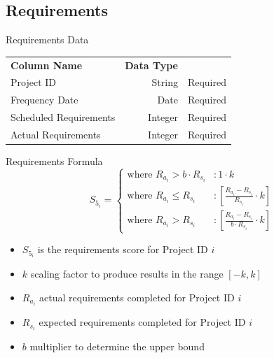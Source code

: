     \subsection{Requirements}
        \begin{frame}{Requirements Data}
            \centering
            \begin{tabular}{l | r | r}
                {\bfseries Column Name}
                 & {\bfseries Data Type}
                 &  \\
                
                Project ID & String  & Required \\
                \myrowcolour%
                Frequency Date & Date & Required \\
                Scheduled Requirements & Integer & Required \\
                \myrowcolour%
                Actual Requirements & Integer  & Required \\
            \end{tabular}
        \end{frame} 
        \begin{frame}{Requirements Formula }
        \begin{displaymath}
            S_{5_i} = \left\{
             \begin{array}{lr}
               \text{where } R_{a_i} > b \cdot R_{s_i} & :  1 \cdot k \\
               \text{where } R_{a_i} \leq R_{s_i} & : \left[ \frac{R_{a_i} - R_{s_i}}{R_{s_i}}\cdot k \right] \\
               \text{where } R_{a_i} > R_{s_i}  & : \left[ \frac{R_{a_i} - R_{s_i} }{b \cdot R_{s_i}}\cdot k \right]
             \end{array}
            \right. 
            \end{displaymath}
            
            \begin{itemize}
                \item $S_{5_i}$ is the requirements score for Project ID $i$
                \item $k$ scaling factor to produce results in the range $[-k,k]$
                \item $R_{a_i}$ actual requirements completed for Project ID $i$
                \item $R_{s_i}$ expected requirements completed for Project ID $i$
                \item $b$ multiplier to determine the upper bound
            \end{itemize}
        \end{frame} 
